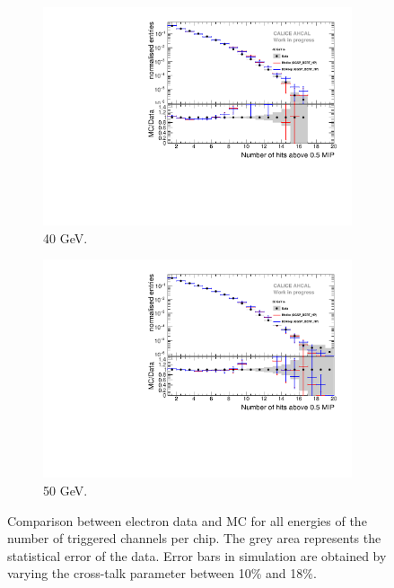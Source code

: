 \begin{figure}[htbp!]
\begin{subfigure}[t]{0.5\textwidth}
		\includegraphics[width=1\textwidth]{../Thesis_Plots/Timing/Electrons/Plots/Comparison_SimData_Electrons_nHits_40GeV.pdf}
		\caption{40 GeV.}\label{fig:elec_sim_data_nHits_40GeV}
	\end{subfigure}
	\hfill
	\begin{subfigure}[t]{0.5\textwidth}
		\centering
		\includegraphics[width=1\textwidth]{../Thesis_Plots/Timing/Electrons/Plots/Comparison_SimData_Electrons_nHits_50GeV.pdf}
		\caption{50 GeV.}\label{fig:elec_sim_data_nHits_50GeV}
	\end{subfigure}
	\caption{Comparison between electron data and MC for all energies of the number of triggered channels per chip. The grey area represents the statistical error of the data. Error bars in simulation are obtained by varying the cross-talk parameter between 10\% and 18\%.}
	\label{fig:sim_data_elec_nHits}
\end{figure}
